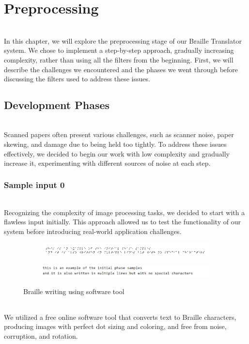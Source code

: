\section{Preprocessing}
\setcounter{figure}{0}
\renewcommand{\thefigure}{4.\arabic{figure}}\\
\quad In this chapter, we will explore the preprocessing stage of our Braille
Translator system. We chose to implement a step-by-step approach,
gradually increasing complexity, rather than using all the filters from
the beginning. First, we will describe the challenges we encountered and
the phases we went through before discussing the filters used to address
these issues.

\hypertarget{development-phases}{%
\subsection{Development Phases}\label{development-phases}}\\
\quad Scanned papers often present various challenges, such as scanner noise, paper skewing, and damage due to being held too tightly. To address these issues effectively, we decided to begin our work with low complexity and gradually increase it, experimenting with different sources of noise at each step.\\
\hypertarget{Sample input 0}{%
\subsubsection{Sample input 0}\label{Sample input 0}}\\
\quad Recognizing the complexity of image processing tasks, we decided to
start with a flawless input initially. This approach
allowed us to test the functionality of our system before introducing
real-world application challenges.

\begin{figure}[h!]
     \centering
     \begin{subfigure}
         \centering
         \includegraphics[width=\textwidth]{image1.png}
         \label{fig:Perfect braille image}
     \end{subfigure}
     \begin{subfigure}
         \centering
         \includegraphics[width=\textwidth]{image2.png}
         \label{fig:Corresponding text}
     \end{subfigure}
        \caption{Braille writing using software tool}
        \label{fig:Braille writing using software tool}
\end{figure}\\
\quad We utilized a free online software tool that converts text to Braille characters, producing images with perfect dot sizing and coloring, and
free from noise, corruption, and rotation.\\

